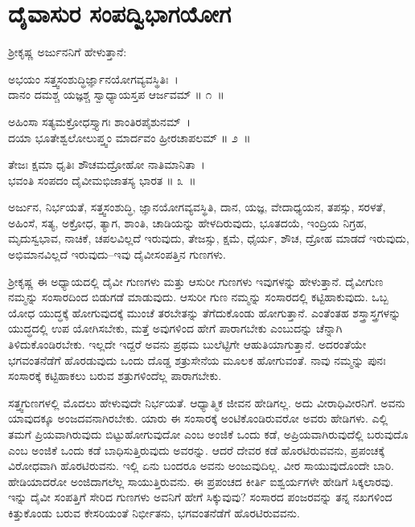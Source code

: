 
\chapter{ದೈವಾಸುರ ಸಂಪದ್ವಿಭಾಗಯೋಗ}

ಶ‍್ರೀಕೃಷ್ಣ ಅರ್ಜುನನಿಗೆ ಹೇಳುತ್ತಾನೆ:

\begin{shloka}
ಅಭಯಂ ಸತ್ತ್ವಸಂಶುದ್ಧಿರ್ಜ್ಞಾನಯೋಗವ್ಯವಸ್ಥಿತಿಃ~।\\ದಾನಂ ದಮಶ್ಚ ಯಜ್ಞಶ್ಚ ಸ್ವಾಧ್ಯಾಯಸ್ತಪ ಆರ್ಜವಮ್ \hfill॥ ೧~॥
\end{shloka}

\begin{shloka}
ಅಹಿಂಸಾ ಸತ್ಯಮಕ್ರೋಧಸ್ತ್ಯಾಗಃ ಶಾಂತಿರಪೈಶುನಮ್~।\\ದಯಾ ಭೂತೇಶ್ವಲೋಲುಪ್ತ್ವಂ ಮಾರ್ದವಂ ಹ್ರೀರಚಾಪಲಮ್ \hfill॥ ೨~॥
\end{shloka}

\begin{shloka}
ತೇಜಃ ಕ್ಷಮಾ ಧೃತಿಃ ಶೌಚಮದ್ರೋಹೋ ನಾತಿಮಾನಿತಾ~।\\ಭವಂತಿ ಸಂಪದಂ ದೈವೀಮಭಿಜಾತಸ್ಯ ಭಾರತ \hfill॥ ೩~॥
\end{shloka}

\begin{artha}
ಅರ್ಜುನ, ನಿರ್ಭಯತೆ, ಸತ್ತ್ವಸಂಶುದ್ಧಿ, ಜ್ಞಾನಯೋಗವ್ಯವಸ್ಥಿತಿ, ದಾನ, ಯಜ್ಞ, ವೇದಾಧ್ಯಯನ, ತಪಸ್ಸು, ಸರಳತೆ, ಅಹಿಂಸೆ, ಸತ್ಯ, ಅಕ್ರೋಧ, ತ್ಯಾಗ, ಶಾಂತಿ, ಚಾಡಿಯನ್ನು ಹೇಳದಿರುವುದು, ಭೂತದಯೆ, ಇಂದ್ರಿಯ ನಿಗ್ರಹ, ಮೃದುಸ್ವಭಾವ, ನಾಚಿಕೆ, ಚಪಲವಿಲ್ಲದೆ ಇರುವುದು, ತೇಜಸ್ಸು, ಕ್ಷಮೆ, ಧೈರ್ಯ, ಶೌಚ, ದ್ರೋಹ ಮಾಡದೆ ಇರುವುದು, ಅಭಿಮಾನವಿಲ್ಲದೆ ಇರುವುದು–ಇವು ದೈವೀಸಂಪತ್ತಿನ ಗುಣಗಳು.
\end{artha}

ಶ‍್ರೀಕೃಷ್ಣ ಈ ಅಧ್ಯಾಯದಲ್ಲಿ ದೈವೀ ಗುಣಗಳು ಮತ್ತು ಆಸುರೀ ಗುಣಗಳು ಇವುಗಳನ್ನು ಹೇಳುತ್ತಾನೆ. ದೈವೀಗುಣ ನಮ್ಮನ್ನು ಸಂಸಾರದಿಂದ ಬಿಡುಗಡೆ ಮಾಡುವುದು. ಆಸುರೀ ಗುಣ ನಮ್ಮನ್ನು ಸಂಸಾರದಲ್ಲಿ ಕಟ್ಟಿಹಾಕುವುದು. ಒಬ್ಬ ಯೋಧ ಯುದ್ಧಕ್ಕೆ ಹೋಗುವುದಕ್ಕೆ ಮುಂಚೆ ತರಬೇತನ್ನು ತೆಗೆದುಕೊಂಡು ಹೋಗುತ್ತಾನೆ. ಎಂತೆಂತಹ ಶಸ್ತ್ರಾಸ್ತ್ರಗಳನ್ನು ಯುದ್ಧದಲ್ಲಿ ಉಪ ಯೋಗಿಸಬೇಕು, ಮತ್ತೆ ಅವುಗಳಿಂದ ಹೇಗೆ ಪಾರಾಗಬೇಕು ಎಂಬುದನ್ನು ಚೆನ್ನಾಗಿ ತಿಳಿದುಕೊಂಡಿರಬೇಕು. ಇಲ್ಲದೇ ಇದ್ದರೆ ಅವನು ಪ್ರಥಮ ಬುಲೆಟ್ಟಿಗೇ ಆಹುತಿಯಾಗುತ್ತಾನೆ. ಅದರಂತೆಯೇ ಭಗವಂತನೆಡೆಗೆ ಹೊರಡುವುದು ಒಂದು ದೊಡ್ಡ ಶತ್ರುಸೇನೆಯ ಮೂಲಕ ಹೋಗುವಂತೆ. ನಾವು ನಮ್ಮನ್ನು ಪುನಃ ಸಂಸಾರಕ್ಕೆ ಕಟ್ಟಿಹಾಕಲು ಬರುವ ಶತ್ರುಗಳಿಂದೆಲ್ಲ ಪಾರಾಗಬೇಕು.

ಸತ್ತ್ವಗುಣಗಳಲ್ಲಿ ಮೊದಲು ಹೇಳುವುದೇ ನಿರ್ಭಯತೆ. ಆಧ್ಯಾತ್ಮಿಕ ಜೀವನ ಹೇಡಿಗಲ್ಲ. ಅದು ವೀರಾಧಿವೀರನಿಗೆ. ಅವನು ಯಾವುದಕ್ಕೂ ಅಂಜದವನಾಗಿರಬೇಕು. ಯಾರು ಈ ಸಂಸಾರಕ್ಕೆ ಅಂಟಿಕೊಂಡಿರುವರೋ ಅವರು ಹೇಡಿಗಳು. ಎಲ್ಲಿ ತಮಗೆ ಪ್ರಿಯವಾಗಿರುವುದು ಬಿಟ್ಟುಹೋಗುವುದೋ ಎಂಬ ಅಂಜಿಕೆ ಒಂದು ಕಡೆ, ಅಪ್ರಿಯವಾಗಿರುವುದೆಲ್ಲಿ ಬರುವುದೊ ಎಂಬ ಅಂಜಿಕೆ ಒಂದು ಕಡೆ ಬಾಧಿಸುತ್ತಿರುವುದು ಅವರನ್ನು. ಆದರೆ ದೇವರ ಕಡೆ ಹೊರಟಿರುವವನು, ಪ್ರಪಂಚಕ್ಕೆ ವಿರೋಧವಾಗಿ ಹೊರಟಿರುವನು. ಇಲ್ಲಿ ಏನು ಬಂದರೂ ಅವನು ಅಂಜುವುದಿಲ್ಲ. ವೀರ ಸಾಯುವುದೊಂದೇ ಬಾರಿ. ಹೇಡಿಯಾದರೋ ಅಂಜಿದಾಗಲೆಲ್ಲ ಸಾಯುತ್ತಿರುವನು. ಈ ಪ್ರಪಂಚದ ಕೀರ್ತಿ ಐಶ್ವರ್ಯಗಳೇ ಹೇಡಿಗೆ ಸಿಕ್ಕಲಾರವು. ಇನ್ನು ದೈವೀ ಸಂಪತ್ತಿಗೆ ಸೇರಿದ ಗುಣಗಳು ಅವನಿಗೆ ಹೇಗೆ ಸಿಕ್ಕುವುವು? ಸಂಸಾರದ ಪಂಜರವನ್ನು ತನ್ನ ನಖಗಳಿಂದ ಕಿತ್ತುಕೊಂಡು ಬರುವ ಕೇಸರಿಯಂತೆ ನಿರ್ಭೀತನು, ಭಗವಂತನೆಡೆಗೆ ಹೊರಟಿರುವವನು.

